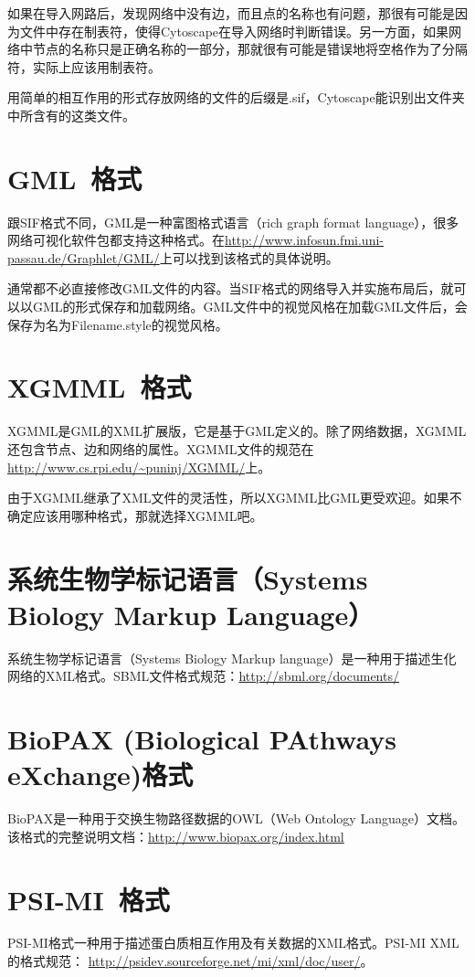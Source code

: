 如果在导入网路后，发现网络中没有边，而且点的名称也有问题，那很有可能是因为文件中存在制表符，使得Cytoscape在导入网络时判断错误。另一方面，如果网络中节点的名称只是正确名称的一部分，那就很有可能是错误地将空格作为了分隔符，实际上应该用制表符。

用简单的相互作用的形式存放网络的文件的后缀是.sif，Cytoscape能识别出文件夹中所含有的这类文件。

\section{GML~格式}
跟SIF格式不同，GML是一种富图格式语言（rich graph format language），很多网络可视化软件包都支持这种格式。在\url{http://www.infosun.fmi.uni-passau.de/Graphlet/GML/}上可以找到该格式的具体说明。

通常都不必直接修改GML文件的内容。当SIF格式的网络导入并实施布局后，就可以以GML的形式保存和加载网络。GML文件中的视觉风格在加载GML文件后，会保存为名为Filename.style的视觉风格。

\section{XGMML~格式}
XGMML是GML的XML扩展版，它是基于GML定义的。除了网络数据，XGMML还包含节点、边和网络的属性。XGMML文件的规范在\url{http://www.cs.rpi.edu/~puninj/XGMML/}上。

由于XGMML继承了XML文件的灵活性，所以XGMML比GML更受欢迎。如果不确定应该用哪种格式，那就选择XGMML吧。

\section{系统生物学标记语言（Systems Biology Markup Language）}
系统生物学标记语言（Systems Biology Markup language）是一种用于描述生化网络的XML格式。SBML文件格式规范：\url{http://sbml.org/documents/}
 
\section{BioPAX (Biological PAthways eXchange)格式}

BioPAX是一种用于交换生物路径数据的OWL（Web Ontology Language）文档。该格式的完整说明文档：\url{http://www.biopax.org/index.html}

\section{PSI-MI~格式}
PSI-MI格式一种用于描述蛋白质相互作用及有关数据的XML格式。PSI-MI XML的格式规范：
\url{http://psidev.sourceforge.net/mi/xml/doc/user/}。

